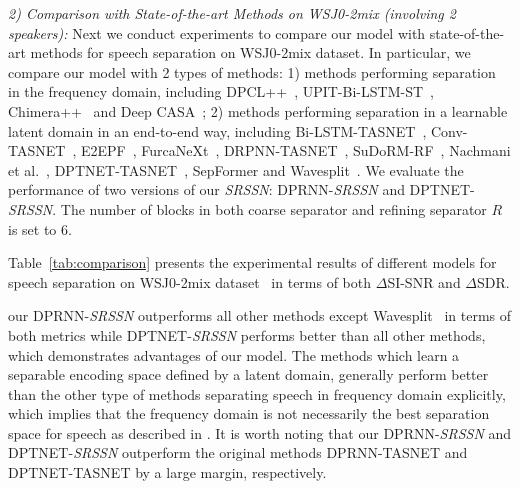 \textit{2) Comparison with State-of-the-art Methods on WSJ0-2mix (involving 2 speakers):}
Next we conduct experiments to compare our model with state-of-the-art methods for speech separation on WSJ0-2mix dataset\cite{DPCL}. In particular, we compare our model with 2 types of methods: 1) methods performing separation in the frequency domain, including DPCL++~\cite{DPCL2}, UPIT-Bi-LSTM-ST~\cite{UPIT}, Chimera++~\cite{Chimera++} and Deep CASA~\cite{CASA}; 2) methods performing separation in a learnable latent domain 
in an end-to-end way, including Bi-LSTM-TASNET~\cite{BLSTM-TasNet}, Conv-TASNET~\cite{Conv-tasnet}, E2EPF~\cite{post},  FurcaNeXt~\cite{furcanext}, DRPNN-TASNET~\cite{DPRNN}, SuDoRM-RF~\cite{sudo}, Nachmani et al.~\cite{MULCAT}, DPTNET-TASNET~\cite{DPTNet}, SepFormer\cite{SepFormer} and Wavesplit~\cite{wavesplit}. We evaluate the performance of two versions of our \emph{SRSSN}: DPRNN-\emph{SRSSN} and DPTNET-\emph{SRSSN}. The number of blocks in both coarse separator and refining separator $R$ is set to 6.

Table~\ref{tab:comparison} presents the experimental results of different models for speech separation on WSJ0-2mix dataset~\cite{wsj0} in terms of both $\Delta$SI-SNR and $\Delta$SDR. 
\begin{comment}
It should be noted that we report all results without using data augmentation for a fair comparison. 
\end{comment}
 our DPRNN-\emph{SRSSN} outperforms all other methods except Wavesplit~\cite{wavesplit} in terms of both metrics while DPTNET-\emph{SRSSN} performs better than all other methods, which demonstrates advantages of our model. The methods which learn a separable encoding space defined by a latent domain, generally perform better than the other type of methods separating speech in frequency domain explicitly, which implies that the frequency domain is not necessarily the best separation space for speech as described in \cite{Conv-tasnet}. It is worth noting that our DPRNN-\emph{SRSSN} and DPTNET-\emph{SRSSN} outperform the original methods DPRNN-TASNET and DPTNET-TASNET by a large margin, respectively.

\begin{comment}
\begin{figure}[!t]
   \centering
   \texttt{[image: memory]}
   \caption{Comparison of GPU memory usage as a function of input speech length at 8Khz sampling rate. The results are reported in inference mode on a single NVIDIA RTX 3090.}
   \label{fig:memory}
\end{figure}
\end{comment}

